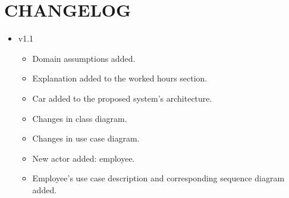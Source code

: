 \section{CHANGELOG}
\begin{itemize}
	\item v1.1
	\begin{itemize}
		\item Domain assumptions added.
		\item Explanation added to the worked hours section.
		\item Car added to the proposed system's architecture.
		\item Changes in class diagram.
		\item Changes in use case diagram.
		\item New actor added: employee.
		\item Employee's use case description and corresponding sequence diagram added.
	\end{itemize}
\end{itemize}